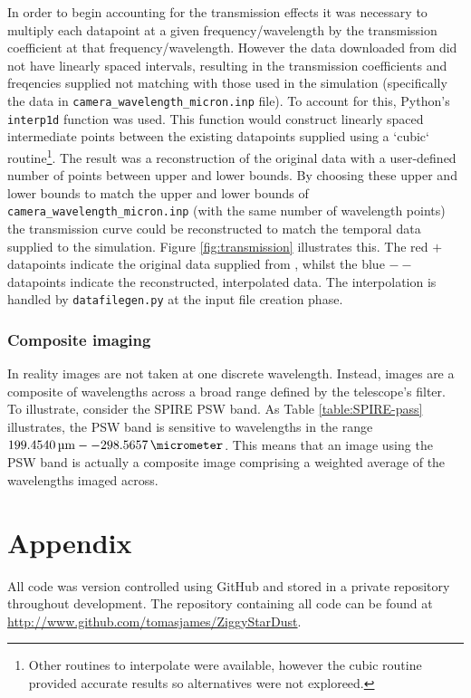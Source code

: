 \documentclass{report}
\begin{document}
In order to begin accounting for the transmission effects it was necessary to multiply each datapoint at a given frequency/wavelength by the transmission coefficient at that frequency/wavelength. However the data downloaded from \textcite{pass} did not have linearly spaced intervals, resulting in the transmission coefficients and freqencies supplied not matching with those used in the simulation (specifically the data in \texttt{camera\_wavelength\_micron.inp} file). To account for this, Python's \texttt{interp1d} function was used. This function would construct linearly spaced intermediate points between the existing datapoints supplied using a `cubic` routine\footnote{Other routines to interpolate were available, however the cubic routine provided accurate results so alternatives were not exploreed.}. The result was a reconstruction of the original data with a user-defined number of points between upper and lower bounds. By choosing these upper and lower bounds to match the upper and lower bounds of \texttt{camera\_wavelength\_micron.inp} (with the same number of wavelength points) the transmission curve could be reconstructed to match the temporal data supplied to the simulation. Figure \ref{fig:transmission} illustrates this. The red $+$ datapoints indicate the original data supplied from \textcite{pass}, whilst the blue $--$ datapoints indicate the reconstructed, interpolated data. The interpolation is handled by \texttt{datafilegen.py} at the input file creation phase.

\subsubsection{Composite imaging}
In reality images are not taken at one discrete wavelength. Instead, images are a composite of wavelengths across a broad range defined by the telescope's filter. To illustrate, consider the SPIRE PSW band. As Table \ref{table:SPIRE-pass} illustrates, the PSW band is sensitive to wavelengths in the range $\SI{199.4540}{\micro\meter} --	\SI{298.5657}{\micrometer}$. This means that an image using the PSW band is actually a composite image comprising a weighted average of the wavelengths imaged across.

\section{Appendix}
All code was version controlled using GitHub and stored in a private repository throughout development. The repository containing all code can be found at \href{http://www.github.com/tomasjames/ZiggyStarDust}{http://www.github.com/tomasjames/ZiggyStarDust}.


\printbibliography


\end{document}
